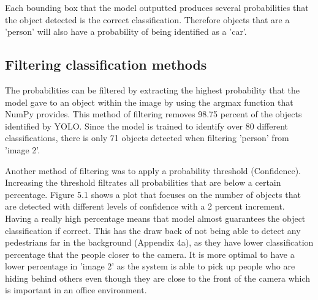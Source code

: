 \documentclass[12pt]{report}
\begin{document}
Each bounding box that the model outputted produces several probabilities that the object detected is the correct classification. Therefore objects that are a 'person' will also have a probability of being identified as a 'car'.

\subsection{Filtering classification methods}

The probabilities can be filtered by extracting the highest probability that the model gave to an object within the image by using the argmax function that NumPy provides. This method of filtering removes 98.75 percent of the objects identified by YOLO. Since the model is trained to identify over 80 different classifications, there is only 71 objects detected when filtering 'person' from 'image 2'.

\vspace{2mm}

Another method of filtering was to apply a probability threshold (Confidence). Increasing the threshold filtrates all probabilities that are below a certain percentage. Figure 5.1 shows a plot that focuses on the number of objects that are detected with different levels of confidence with a 2 percent increment. Having a really high percentage means that model almost guarantees the object classification if correct. This has the draw back of not being able to detect any pedestrians far in the background (Appendix 4a), as they have lower classification percentage that the people closer to the camera. It is more optimal to have a lower percentage in 'image 2' as the system is able to pick up people who are hiding behind others even though they are close to the front of the camera which is important in an office environment.
\end{document}
